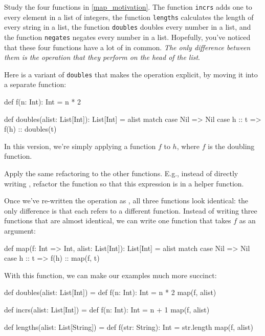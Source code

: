 \documentclass[9pt]{extbook}
\begin{document}
Study the four functions in \cref{map_motivation}. The function \verb|incrs|
adds one to every element in a list of integers, the function \verb|lengths|
calculates the length of every string in a list, the function \verb|doubles|
doubles every number in a list, and the function \verb|negates| negates every
number in a list. Hopefully, you've noticed that these four functions have a lot
of in common. \emph{The only difference between them is the operation that they
perform on the head of the list}.

Here is a variant of \verb|doubles| that makes the operation explicit, by
moving it into a separate function:
%
\begin{scalacode}
def f(n: Int): Int = n * 2

def doubles(alist: List[Int]): List[Int] = alist match {
  case Nil => Nil
  case h :: t => f(h) :: doubles(t)
}
\end{scalacode}

In this version, we're simply applying a function $f$ to $h$, where $f$
is the doubling function.

\begin{think}
Apply the same refactoring to the other
functions. E.g.,  instead of directly writing , refactor
the function so that this expression is in a helper function.
\end{think}

Once we've re-written the operation as , all three
functions look identical: the only difference is that each refers to a
different function.
Instead of writing three functions that are almost identical, we can
write one function that takes $f$ as an argument:

\begin{scalacode}
def map(f: Int => Int, alist: List[Int]): List[Int] = alist match {
  case Nil => Nil
  case h :: t => f(h) :: map(f, t)
}
\end{scalacode}

With this function, we can make our examples much more succinct:

\begin{scalacode}
def doubles(alist: List[Int]) = {
  def f(n: Int): Int = n * 2
  map(f, alist)
}

def incrs(alist: List[Int]) = {
  def f(n: Int): Int = n + 1
  map(f, alist)
}

def lengths(alist: List[String]) = {
  def f(str: String): Int = str.length
  map(f, alist)
}
\end{scalacode}
\end{document}
